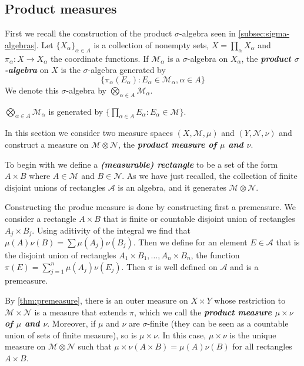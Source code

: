 \documentclass{article}
\theoremstyle{definition}
\numberwithin{equation}{section}
\begin{document}
	\subsection{Product measures}
	First we recall the construction of the product $\sigma$-algebra seen in \cref{subsec:sigma-algebras}. Let $\{X_\alpha\}_{\alpha\in A}$ is a collection of nonempty sets, $X=\prod_\alpha X_\alpha$ and $\pi_\alpha:X\to X_\alpha$ the coordinate functions. If $\mathcal{M}_\alpha$ is a $\sigma$-algebra on $X_\alpha$, the \textbf{\textit{product $\sigma$-algebra}} on $X$ is the $\sigma$-algebra generated by
	\[\{\pi_\alpha(E_\alpha):E_\alpha\in\mathcal{M}_\alpha,\alpha\in A\}\]
	We denote this $\sigma$-algebra by $\bigotimes_{\alpha\in A}\mathcal{M}_\alpha$.
	\begin{prop}
		$\bigotimes_{\alpha\in A}\mathcal{M}_\alpha$ is generated by $\{\prod_{\alpha\in A}E_\alpha:E_\alpha\in\mathcal{M}\}$. 
	\end{prop}
	
	In this section we consider two measure spaces $(X,\mathcal{M},\mu)$ and $(Y,\mathcal{N},\nu)$ and construct a measure on $\mathcal{M}\otimes\mathcal{N}$, the \textbf{\textit{product measure of $\mu$ and $\nu$}}.
	
	To begin with we define a \textbf{\textit{(measurable) rectangle}} to be a set of the form $A\times B$ where $A\in\mathcal{M}$ and $B\in\mathcal{N}$. As we have just recalled, the collection of finite disjoint unions of rectangles $\mathcal{A}$  is an algebra, and it generates $\mathcal{M}\otimes\mathcal{N}$.
	
	Constructing the produc measure is done by constructing first a premeasure. We consider a rectangle $A\times B$ that is finite or countable disjoint union of rectangles $A_j\times B_j$. Using aditivity of the integral we find that $\mu(A)\nu(B)=\sum\mu(A_j)\nu(B_j)$. Then we define for an element $E\in \mathcal{A}$ that is the disjoint union of rectangles $A_1\times B_1,\ldots,A_n\times B_n$, the function $\pi(E)=\sum_{j=1}^n\mu(A_j)\nu(E_j)$. Then $\pi$ is well defined on $\mathcal{A}$ and is a premeasure.
	
	By \cref{thm:premeasure}, there is an outer measure on $X\times Y$ whose restriction to $\mathcal{M}\times\mathcal{N}$ is a measure that extends $\pi$, which we call the \textbf{\textit{product measure $\mu\times\nu$ of $\mu$ and $\nu$}}. Moreover, if $\mu$ and $\nu$ are $\sigma$-finite (they can be seen as a countable union of sets of finite measure), so is $\mu\times\nu$. In this case, $\mu\times\nu$ is the unique measure on $\mathcal{M}\otimes\mathcal{N}$ such that $\mu\times\nu(A\times B)=\mu(A)\nu(B)$ for all rectangles $A\times B$.
	
\end{document}
